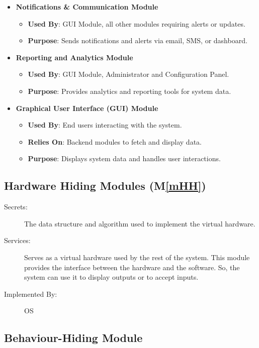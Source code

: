 \documentclass[12pt, titlepage]{article}
\newcommand{\mref}[1]{M\ref{#1}}
\begin{document}
\begin{itemize}
    \item \textbf{Notifications \& Communication Module}
    \begin{itemize}
        \item \textbf{Used By}: GUI Module, all other modules requiring alerts or updates.
        \item \textbf{Purpose}: Sends notifications and alerts via email, SMS, or dashboard.
    \end{itemize}
    
    \item \textbf{Reporting and Analytics Module}
    \begin{itemize}
        \item \textbf{Used By}: GUI Module, Administrator and Configuration Panel.
        \item \textbf{Purpose}: Provides analytics and reporting tools for system data.
    \end{itemize}
    
    \item \textbf{Graphical User Interface (GUI) Module}
    \begin{itemize}
        \item \textbf{Used By}: End users interacting with the system.
        \item \textbf{Relies On}: Backend modules to fetch and display data.
        \item \textbf{Purpose}: Displays system data and handles user interactions.
    \end{itemize}
\end{itemize}

\subsection{Hardware Hiding Modules (\mref{mHH})}

\begin{description}
\item[Secrets:]The data structure and algorithm used to implement the virtual
  hardware.
\item[Services:]Serves as a virtual hardware used by the rest of the
  system. This module provides the interface between the hardware and the
  software. So, the system can use it to display outputs or to accept inputs.
\item[Implemented By:] OS
\end{description}

\subsection{Behaviour-Hiding Module}
\end{document}
